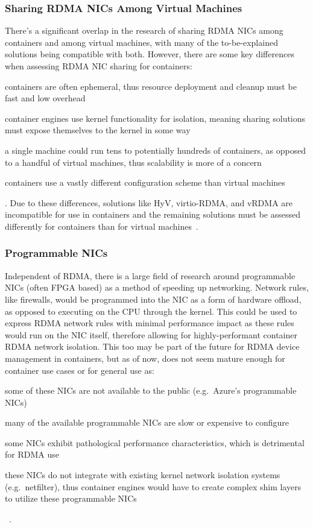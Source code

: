 \documentclass[12pt,titlepage]{article}
\begin{document}
\subsubsection{Sharing RDMA NICs Among Virtual Machines}
There's a significant overlap in the research of sharing RDMA NICs among containers and among virtual machines, with many of the to-be-explained solutions being compatible with both.
However, there are some key differences when assessing RDMA NIC sharing for containers:
\begin{enumerate*}[label={(\arabic*)},itemjoin*={{, and }},itemjoin={{, }}]
	\item containers are often ephemeral, thus resource deployment and cleanup must be fast and low overhead
	\item container engines use kernel functionality for isolation, meaning sharing solutions must expose themselves to the kernel in some way
	\item a single machine could run tens to potentially hundreds of containers, as opposed to a handful of virtual machines, thus scalability is more of a concern
	\item containers use a vastly different configuration scheme than virtual machines
\end{enumerate*}.
Due to these differences, solutions like HyV, virtio-RDMA, and vRDMA are incompatible for use in containers and the remaining solutions must be assessed differently for containers than for virtual machines~\cite{fan2017towards,hyvpaper,vrdmavmware}.

\subsubsection{Programmable NICs}
Independent of RDMA, there is a large field of research around programmable NICs (often FPGA based) as a method of speeding up networking.
Network rules, like firewalls, would be programmed into the NIC as a form of hardware offload, as opposed to executing on the CPU through the kernel.
This could be used to express RDMA network rules with minimal performance impact as these rules would run on the NIC itself, therefore allowing for highly-performant container RDMA network isolation.
This too may be part of the future for RDMA device management in containers, but as of now, does not seem mature enough for container use cases or for general use as:
\begin{enumerate*}[label={(\arabic*)},itemjoin*={{, and }},itemjoin={{, }}]
	\item some of these NICs are not available to the public (e.g.\ Azure's programmable NICs)
	\item many of the available programmable NICs are slow or expensive to configure
	\item some NICs exhibit pathological performance characteristics, which is detrimental for RDMA use
	\item these NICs do not integrate with existing kernel network isolation systems (e.g.\ netfilter), thus container engines would have to create complex shim layers to utilize these programmable NICs
\end{enumerate*}~\cite{firestone2018azure,stephens2019loom,katsikas2021you,liu2021performance,kim2020case}.
\end{document}
